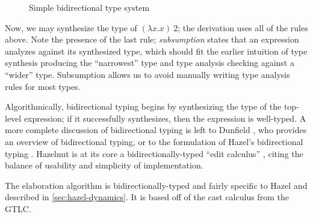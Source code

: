 \begin{figure}
  \centering
  \begin{mdframed}
    \begin{singlespace}
    \end{singlespace}
  \end{mdframed}
  \caption{Simple bidirectional type system}
  \label{fig:bidirectional-typing}
\end{figure}

Now, we may synthesize the type of $(\lambda x.x)\ 2$; the derivation uses all of the rules above. Note the presence of the last rule; \textit{subsumption} states that an expression analyzes against its synthesized type, which should fit the earlier intuition of type synthesis producing the ``narrowest'' type and type analysis checking against a ``wider'' type. Subsumption allows us to avoid manually writing type analysis rules for most types.

Algorithmically, bidirectional typing begins by synthesizing the type of the top-level expression; if it successfully synthesizes, then the expression is well-typed. A more complete discussion of bidirectional typing is left to Dunfield \cite{Dunfield_2022}, who provides an overview of bidirectional typing, or to the formulation of Hazel's bidirectional typing \cite{conf/popl/Hazelnut17}. Hazelnut is at its core a bidirectionally-typed ``edit calculus'' \cite{conf/popl/Hazelnut17}, citing the balance of usability and simplicity of implementation.

The elaboration algorithm is bidirectionally-typed and fairly specific to Hazel and described in \cref{sec:hazel-dynamics}. It is based off of the cast calculus from the GTLC.

